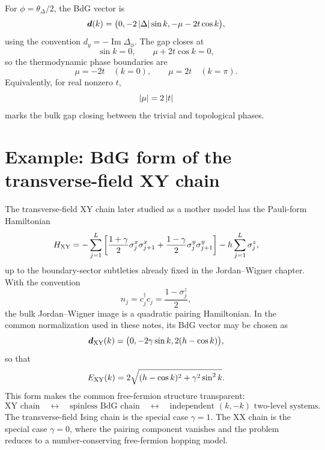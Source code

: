 For $\phi=\theta_\Delta/2$, the BdG vector is
\begin{equation}
    \bm{d}(k)
    =
    \bigl(0,-2\left|\Delta\right|\sin k,-\mu-2t\cos k\bigr),
\end{equation}
using the convention $d_y=-\operatorname{Im}\Delta_\phi$.  The gap closes at
\begin{equation}
    \sin k=0,
    \qquad
    \mu+2t\cos k=0,
\end{equation}
so the thermodynamic phase boundaries are
\begin{equation}
\label{eq:bdg-chapter-kitaev-phase-boundaries}
    \mu=-2t
    \quad (k=0),
    \qquad
    \mu=2t
    \quad (k=\pi).
\end{equation}
Equivalently, for real nonzero $t$,
\begin{equation}
    \left|\mu\right|=2\left|t\right|
\end{equation}
marks the bulk gap closing between the trivial and topological phases.

\section{Example: BdG form of the transverse-field XY chain}

The transverse-field XY chain later studied as a mother model has the Pauli-form
Hamiltonian
\begin{equation}
\label{eq:bdg-chapter-xy-spin-hamiltonian}
    H_{\rm XY}
    =
    -\sum_{j=1}^{L}
    \left[
        \frac{1+\gamma}{2}\sigma_j^x\sigma_{j+1}^x
        +
        \frac{1-\gamma}{2}\sigma_j^y\sigma_{j+1}^y
    \right]
    -h\sum_{j=1}^{L}\sigma_j^z,
\end{equation}
up to the boundary-sector subtleties already fixed in the Jordan--Wigner chapter.
With the convention
\begin{equation}
    n_j=c_j^\dagger c_j=\frac{1-\sigma_j^z}{2},
\end{equation}
the bulk Jordan--Wigner image is a quadratic pairing Hamiltonian.  In the common
normalization used in these notes, its BdG vector may be chosen as
\begin{equation}
\label{eq:bdg-chapter-xy-d-vector}
    \bm{d}_{\rm XY}(k)
    =
    \bigl(0,-2\gamma\sin k,2(h-\cos k)\bigr),
\end{equation}
so that
\begin{equation}
\label{eq:bdg-chapter-xy-spectrum}
    E_{\rm XY}(k)
    =
    2\sqrt{(h-\cos k)^2+\gamma^2\sin^2 k}.
\end{equation}
This form makes the common free-fermion structure transparent:
\begin{equation}
    \text{XY chain}
    \quad\longleftrightarrow\quad
    \text{spinless BdG chain}
    \quad\longleftrightarrow\quad
    \text{independent }(k,-k)\text{ two-level systems}.
\end{equation}
The transverse-field Ising chain is the special case $\gamma=1$.  The XX chain is
the special case $\gamma=0$, where the pairing component vanishes and the problem
reduces to a number-conserving free-fermion hopping model.

